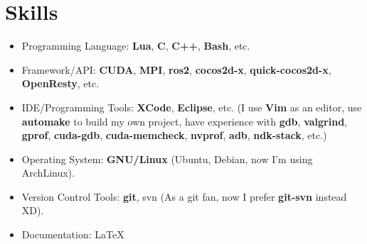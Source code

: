 \documentclass[letterpaper]{article}
\begin{document}
\section*{Skills}
\begin{itemize}
    \item Programming Language: \textbf{Lua}, \textbf{C}, \textbf{C++}, \textbf{Bash}, etc.
    \item Framework/API: \textbf{CUDA}, \textbf{MPI}, \textbf{ros2}, \textbf{cocos2d-x}, \textbf{quick-cocos2d-x}, \textbf{OpenResty}, etc.
    \item IDE/Programming Tools: \textbf{XCode}, \textbf{Eclipse}, etc. (I use \textbf{Vim} as an editor, use \textbf{automake} to build my own project, have experience with \textbf{gdb}, \textbf{valgrind}, \textbf{gprof}, \textbf{cuda-gdb}, \textbf{cuda-memcheck}, \textbf{nvprof}, \textbf{adb}, \textbf{ndk-stack}, etc.)
    \item Operating System: \textbf{GNU/Linux} (Ubuntu, Debian, now I'm using ArchLinux).
    \item Version Control Tools: \textbf{git}, svn (As a git fan, now I prefer \textbf{git-svn} instead XD).
    \item Documentation: \LaTeX
\end{itemize}
\end{document}
